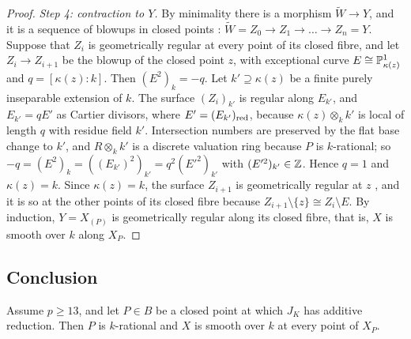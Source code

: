 \begin{proof}
\emph{Step 4: contraction to $Y$.}
By minimality there is a morphism $\widetilde W\to Y$, and it is a sequence of blowups in closed points \cite[Tag~]{Stacks}: $\widetilde W = Z_0\to Z_1\to\dots\to Z_n = Y$.
Suppose that $Z_i$ is geometrically regular at every point of its closed fibre, and let $Z_i\to Z_{i+1}$ be the blowup of the closed point $z$, with exceptional curve $E\cong\mathbb{P}^1_{\kappa(z)}$ and $q = [\kappa(z):k]$.
Then $(E^2)_k = -q$.
Let $k'\supseteq\kappa(z)$ be a finite purely inseparable extension of $k$.
The surface $(Z_i)_{k'}$ is regular along $E_{k'}$, and $E_{k'} = qE'$ as Cartier divisors, where $E' = (E_{k'})_{\rm red}$, because $\kappa(z)\otimes_kk'$ is local of length $q$ with residue field $k'$.
Intersection numbers are preserved by the flat base change to $k'$, and $R\otimes_kk'$ is a discrete valuation ring because $P$ is $k$-rational; so $-q = (E^2)_k = ((E_{k'})^2)_{k'} = q^2(E'^2)_{k'}$ with $(E'^2)_{k'}\in\mathbb{Z}$.
Hence $q = 1$ and $\kappa(z) = k$.
Since $\kappa(z) = k$, the surface $Z_{i+1}$ is geometrically regular at $z$ \cite[Tag~]{Stacks}, and it is so at the other points of its closed fibre because $Z_{i+1}\setminus\{z\}\cong Z_i\setminus E$.
By induction, $Y = X_{(P)}$ is geometrically regular along its closed fibre, that is, $X$ is smooth over $k$ along $X_P$.
\end{proof}

\subsection{Conclusion}

\begin{proposition}\label{prop:additive}
Assume $p\geq 13$, and let $P\in B$ be a closed point at which $J_K$ has additive reduction.
Then $P$ is $k$-rational and $X$ is smooth over $k$ at every point of $X_P$.
\end{proposition}

